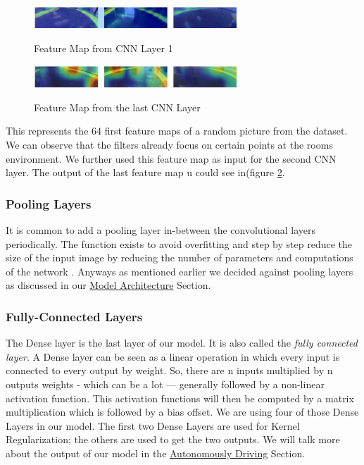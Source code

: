 \documentclass[journal]{IEEEtran}
\begin{document}
\begin{figure}
  \begin{center}
  \includegraphics[width=3in]{photo/frist-cl}\\
  \caption{Feature Map from CNN Layer 1}\label{featuremap1}
  \end{center}
\end{figure}
\begin{figure}
  \begin{center}
  \includegraphics[width=3in]{photo/layer2}\\
  \caption{Feature Map from the last CNN Layer}\label{featuremap2}
  \end{center}
\end{figure}
This represents the 64 first feature maps of a random picture from the dataset. We can observe that the filters already focus on certain points at the rooms environment. We further used this feature map as input for the second CNN layer. The output of the last feature map u could see in(figure \ref{featuremap2}.\\
\subsubsection{Pooling Layers}
\noindent It is common to add a pooling layer in-between the convolutional layers periodically. The function exists to avoid overfitting and step by step reduce the size of the input image by reducing the number of parameters and computations of the network \cite{RN2}. Anyways as mentioned earlier we decided against pooling layers as discussed in our \hyperref[subsec:ModelArchitecture]{Model Architecture} Section.\\
\subsubsection{Fully-Connected Layers}
\noindent The Dense layer is the last layer of our model. It is also called the \textit{fully connected layer}.  A Dense layer can be seen as a linear operation in which every input is connected to every output by weight. So, there are n inputs multiplied by n outputs weights - which can be a lot — generally followed by a non-linear activation function. This activation functions will then be computed by a matrix multiplication which is followed by a bias offset. 
We are using four of those Dense Layers in our model. The first two Dense Layers are used for Kernel Regularization; the others are used to get the two outputs. We will talk more about the output of our model in the \hyperref[sec:AutonomouslyDriving]{Autonomously Driving} Section. \\
\end{document}
